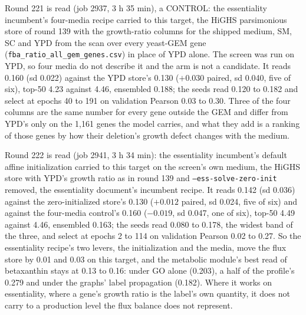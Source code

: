 Round 221 is read (job 2937, 3 h 35 min), a CONTROL: the essentiality incumbent's
four-media recipe carried to this target, the HiGHS parsimonious store of round 139
with the growth-ratio columns for the shipped medium, SM, SC and YPD from the scan over
every yeast-GEM gene (\texttt{fba\_ratio\_all\_gem\_genes.csv}) in place of YPD alone.
The screen was run on YPD, so four media do not describe it and the arm is not a
candidate. It reads 0.160 (sd 0.022) against the YPD store's 0.130 ($+0.030$ paired, sd
0.040, five of six), top-50 4.23 against 4.46, ensembled 0.188; the seeds read 0.120
to 0.182 and select at epochs 40 to 191 on validation Pearson 0.03 to 0.30. Three of
the four columns are the same number for every gene outside the GEM and differ from
YPD's only on the 1,161 genes the model carries, and what they add is a ranking of
those genes by how their deletion's growth defect changes with the medium.

Round 222 is read (job 2941, 3 h 34 min): the essentiality incumbent's default affine
initialization carried to this target on the screen's own medium, the HiGHS store with
YPD's growth ratio as in round 139 and \texttt{--ess-solve-zero-init} removed, the
essentiality document's incumbent recipe. It reads 0.142 (sd 0.036)
against the zero-initialized store's 0.130 ($+0.012$ paired, sd 0.024, five of six) and
against the four-media control's 0.160 ($-0.019$, sd 0.047, one of six), top-50 4.49
against 4.46, ensembled 0.163; the seeds read 0.080 to 0.178, the widest band of the
three, and select at epochs 2 to 114 on validation Pearson 0.02 to 0.27. So the
essentiality recipe's two levers, the initialization and the media, move the flux
store by 0.01 and 0.03 on this target, and the metabolic module's best read of
betaxanthin stays at 0.13 to 0.16: under GO alone (0.203), a half of the profile's
0.279 and under the graphs' label propagation (0.182). Where it works on essentiality,
where a gene's growth ratio is the label's own quantity, it does not carry to a
production level the flux balance does not represent.

